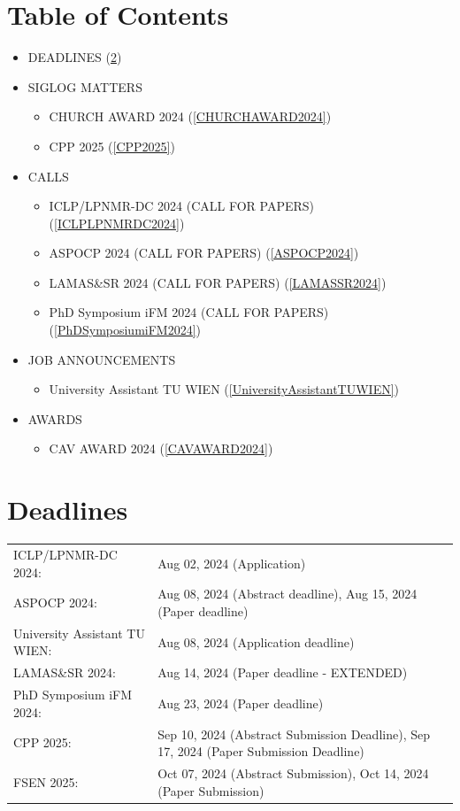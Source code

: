 \documentclass[prodmode,acmtecs]{acmsmall} %
\begin{document}
\section{Table of Contents}\begin{itemize}\item DEADLINES (\cref{deadlines}) 
 
\item SIGLOG MATTERS 
 
\begin{itemize}\item CHURCH AWARD 2024 (\cref{CHURCHAWARD2024})
\item CPP 2025 (\cref{CPP2025})
\end{itemize} 
\item CALLS 
 
\begin{itemize}\item ICLP/LPNMR-DC 2024 (CALL FOR PAPERS) (\cref{ICLPLPNMRDC2024})
\item ASPOCP 2024 (CALL FOR PAPERS) (\cref{ASPOCP2024})
\item LAMAS\&SR 2024 (CALL FOR PAPERS) (\cref{LAMASSR2024})
\item PhD Symposium iFM 2024 (CALL FOR PAPERS) (\cref{PhDSymposiumiFM2024})
\end{itemize} 
\item JOB ANNOUNCEMENTS 
 
\begin{itemize}\item University Assistant TU WIEN (\cref{UniversityAssistantTUWIEN})
\end{itemize} 
\item AWARDS 
 
\begin{itemize}\item CAV AWARD 2024 (\cref{CAVAWARD2024})
\end{itemize} 
\end{itemize}\section{Deadlines}\label{deadlines}\begin{tabulary}{\linewidth}{LL}ICLP/LPNMR-DC 2024:  & Aug 02, 2024 (Application) \\
ASPOCP 2024:  & Aug 08, 2024 (Abstract  deadline), Aug 15, 2024 (Paper  deadline) \\
University Assistant TU WIEN:  & Aug 08, 2024 (Application deadline) \\
LAMAS\&SR 2024:  & Aug 14, 2024 (Paper  deadline - EXTENDED) \\
PhD Symposium iFM 2024:  & Aug 23, 2024 (Paper  deadline) \\
CPP 2025:  & Sep 10, 2024 (Abstract Submission Deadline), Sep 17, 2024 (Paper Submission Deadline) \\
FSEN 2025:  & Oct 07, 2024 (Abstract Submission), Oct 14, 2024 (Paper Submission) \\
\end{tabulary}
\end{document}
